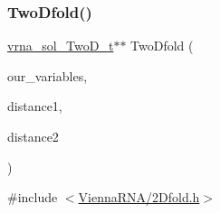\subsubsection{\texorpdfstring{Two\+Dfold()}{TwoDfold()}}
{\footnotesize\ttfamily \mbox{\hyperlink{group__kl__neighborhood__mfe_structvrna__sol___two_d__t}{vrna\+\_\+sol\+\_\+\+Two\+D\+\_\+t}}$\ast$$\ast$ Two\+Dfold (\begin{DoxyParamCaption}\item[{\mbox{\hyperlink{group__kl__neighborhood__mfe_struct_two_dfold__vars}{Two\+Dfold\+\_\+vars}} $\ast$}]{our\+\_\+variables,  }\item[{int}]{distance1,  }\item[{int}]{distance2 }\end{DoxyParamCaption})}



{\ttfamily \#include $<$\mbox{\hyperlink{2_dfold_8h}{Vienna\+R\+N\+A/2\+Dfold.\+h}}$>$}

